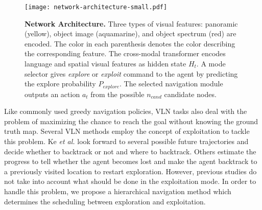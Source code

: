 \documentclass[10pt,twocolumn,letterpaper]{article}
\begin{document}
\begin{figure*}[ht!]{\centering\texttt{[image: network-architecture-small.pdf]}}\centering
\caption{\protect\renewcommand{\baselinestretch}{0.89}\protect\small{\protect\textbf{Network Architecture.} Three types of visual features: panoramic (yellow), object image (aquamarine), and object spectrum (red) are encoded. The color in each parenthesis denotes the color describing the corresponding feature. The cross-modal transformer encodes language and spatial visual features as hidden state $H_t$. A mode selector gives \textit{explore} or \textit{exploit} command to the agent by predicting the explore probability $P_{explore}$. The selected navigation module outputs an action $a_t$ from the possible $n_{cand}$ candidate nodes.}} \label{fig:network-architecture}\vspace{-0.5cm}
\end{figure*}

Like commonly used greedy navigation policies, VLN tasks also deal with the problem of maximizing the chance to reach the goal without knowing the ground truth map. Several VLN methods employ the concept of exploitation to tackle this problem. Ke \textit{et al.} \cite{ke2019tactical} look forward to several possible future trajectories and decide whether to backtrack or not and where to backtrack. Others \cite{ma2019self, ma2019regretful, zhu2020vision} estimate the progress to tell whether the agent becomes lost and make the agent backtrack to a previously visited location to restart exploration.
 However, previous studies do not take into account what should be done in the exploitation mode. In order to handle this problem, we propose a hierarchical navigation method which determines the scheduling between exploration and exploitation.
 \font=2.5pt
\vspace{-0.2cm}
\end{document}
